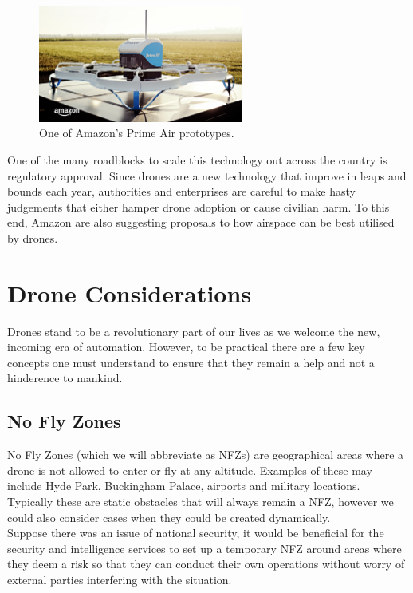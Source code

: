 \documentclass[a4paper,11pt,titlepage]{report}
\begin{document}
\begin{figure}[!hbpt]
  \centering
  \includegraphics[width=0.6\textwidth]{img/amazon_prime_air_drone.png}
  \caption{One of Amazon's Prime Air prototypes. \cite{Amazon.comInc.}}
  \label{fig:prime_air_example}
\end{figure}

One of the many roadblocks to scale this technology out across the country is regulatory approval. Since drones are a new technology that improve in leaps and bounds each year, authorities and enterprises are careful to make hasty judgements that either hamper drone adoption or cause civilian harm. To this end, Amazon are also suggesting proposals to how airspace can be best utilised by drones. \cite{Amazon.comInc.2015} \cite{Amazon.comInc.2015a}

\section{Drone Considerations}
Drones stand to be a revolutionary part of our lives as we welcome the new, incoming era of automation. However, to be practical there are a few key concepts one must understand to ensure that they remain a help and not a hinderence to mankind.

\subsection{No Fly Zones}
No Fly Zones (which we will abbreviate as NFZs) are geographical areas where a drone is not allowed to enter or fly at any altitude. Examples of these may include Hyde Park, Buckingham Palace, airports and military locations. Typically these are static obstacles that will always remain a NFZ, however we could also consider cases when they could be created dynamically.\\

Suppose there was an issue of national security, it would be beneficial for the security and intelligence services to set up a temporary NFZ around areas where they deem a risk so that they can conduct their own operations without worry of external parties interfering with the situation.
\end{document}
